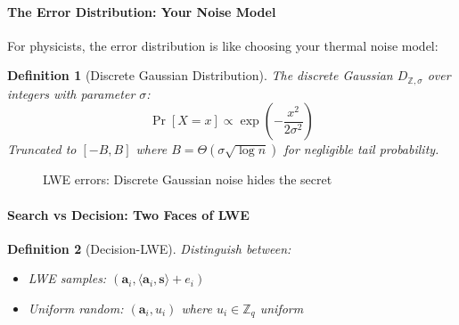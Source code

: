 \documentclass[11pt,a4paper]{article}
\newtheorem{definition}{Definition}
\begin{document}
\paragraph{The Error Distribution: Your Noise Model}

For physicists, the error distribution is like choosing your thermal noise model:

\begin{definition}[Discrete Gaussian Distribution]
The discrete Gaussian $D_{\mathbb{Z}, \sigma}$ over integers with parameter $\sigma$:
$$\Pr[X = x] \propto \exp\left(-\frac{x^2}{2\sigma^2}\right)$$
Truncated to $[-B, B]$ where $B = \Theta(\sigma \sqrt{\log n})$ for negligible tail probability.
\end{definition}

\begin{figure}[h]
\centering
{}
\caption{LWE errors: Discrete Gaussian noise hides the secret}
\end{figure}

\paragraph{Search vs Decision: Two Faces of LWE}

\begin{definition}[Decision-LWE]
Distinguish between:
\begin{itemize}
    \item LWE samples: $(\mathbf{a}_i, \langle \mathbf{a}_i, \mathbf{s} \rangle + e_i)$
    \item Uniform random: $(\mathbf{a}_i, u_i)$ where $u_i \in \mathbb{Z}_q$ uniform
\end{itemize}
\end{definition}
\end{document}
